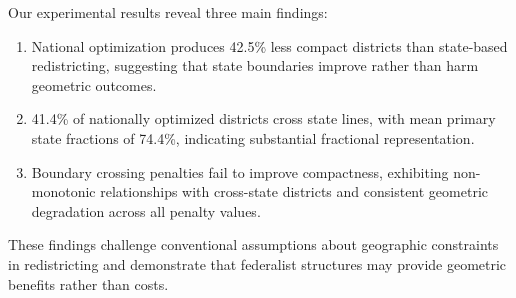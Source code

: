 Our experimental results reveal three main findings:
\begin{enumerate}
    \item National optimization produces 42.5\% less compact districts than state-based redistricting, suggesting that state boundaries improve rather than harm geometric outcomes.
    \item 41.4\% of nationally optimized districts cross state lines, with mean primary state fractions of 74.4\%, indicating substantial fractional representation.
    \item Boundary crossing penalties fail to improve compactness, exhibiting non-monotonic relationships with cross-state districts and consistent geometric degradation across all penalty values.
\end{enumerate}

These findings challenge conventional assumptions about geographic constraints in redistricting and demonstrate that federalist structures may provide geometric benefits rather than costs.
